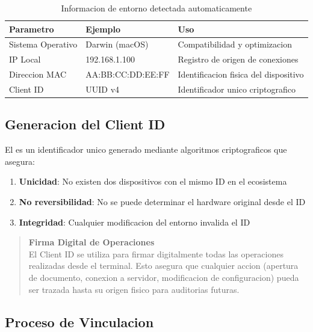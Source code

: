 \begin{table}[H]
\centering
\begin{tabular}{p{4cm}p{3cm}p{7cm}}
\toprule
\textbf{Parametro} & \textbf{Ejemplo} & \textbf{Uso} \\
\midrule
Sistema Operativo & Darwin (macOS) & Compatibilidad y optimizacion \\
IP Local & 192.168.1.100 & Registro de origen de conexiones \\
Direccion MAC & AA:BB:CC:DD:EE:FF & Identificacion fisica del dispositivo \\
Client ID & UUID v4 & Identificador unico criptografico \\
\bottomrule
\end{tabular}
\caption{Informacion de entorno detectada automaticamente}
\label{tab:info-entorno}
\end{table}

\subsection{Generacion del Client ID}

El  es un identificador unico generado mediante algoritmos criptograficos que asegura:

\begin{enumerate}[leftmargin=*]
    \item \textbf{Unicidad}: No existen dos dispositivos con el mismo ID en el ecosistema
    \item \textbf{No reversibilidad}: No se puede determinar el hardware original desde el ID
    \item \textbf{Integridad}: Cualquier modificacion del entorno invalida el ID
\end{enumerate}

\begin{quote}
\textbf{Firma Digital de Operaciones}\\
\small
El Client ID se utiliza para firmar digitalmente todas las operaciones realizadas desde el terminal. Esto asegura que cualquier accion (apertura de documento, conexion a servidor, modificacion de configuracion) pueda ser trazada hasta su origen fisico para auditorias futuras.
\end{quote}

\subsection{Proceso de Vinculacion}

